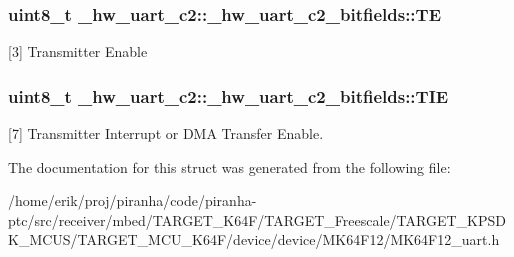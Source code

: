 \subsubsection[{\texorpdfstring{TE}{TE}}]{\setlength{\rightskip}{0pt plus 5cm}uint8\+\_\+t \+\_\+hw\+\_\+uart\+\_\+c2\+::\+\_\+hw\+\_\+uart\+\_\+c2\+\_\+bitfields\+::\+TE}\hypertarget{struct__hw__uart__c2_1_1__hw__uart__c2__bitfields_a999d24fa7a89d29547dd6bf40a97ab9b}{}\label{struct__hw__uart__c2_1_1__hw__uart__c2__bitfields_a999d24fa7a89d29547dd6bf40a97ab9b}
\mbox{[}3\mbox{]} Transmitter Enable 
\subsubsection[{\texorpdfstring{T\+IE}{TIE}}]{\setlength{\rightskip}{0pt plus 5cm}uint8\+\_\+t \+\_\+hw\+\_\+uart\+\_\+c2\+::\+\_\+hw\+\_\+uart\+\_\+c2\+\_\+bitfields\+::\+T\+IE}\hypertarget{struct__hw__uart__c2_1_1__hw__uart__c2__bitfields_a900e675aadbe62c7f8039ec49597e503}{}\label{struct__hw__uart__c2_1_1__hw__uart__c2__bitfields_a900e675aadbe62c7f8039ec49597e503}
\mbox{[}7\mbox{]} Transmitter Interrupt or D\+MA Transfer Enable. 

The documentation for this struct was generated from the following file\+:\begin{DoxyCompactItemize}
\item 
/home/erik/proj/piranha/code/piranha-\/ptc/src/receiver/mbed/\+T\+A\+R\+G\+E\+T\+\_\+\+K64\+F/\+T\+A\+R\+G\+E\+T\+\_\+\+Freescale/\+T\+A\+R\+G\+E\+T\+\_\+\+K\+P\+S\+D\+K\+\_\+\+M\+C\+U\+S/\+T\+A\+R\+G\+E\+T\+\_\+\+M\+C\+U\+\_\+\+K64\+F/device/device/\+M\+K64\+F12/M\+K64\+F12\+\_\+uart.\+h\end{DoxyCompactItemize}
